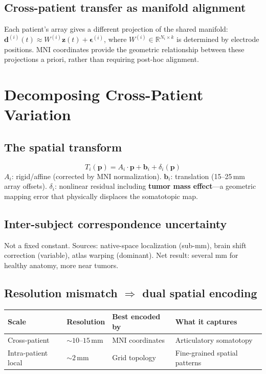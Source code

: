 \documentclass[11pt,letterpaper]{article}
\newcommand{\bfp}{\mathbf{p}}
\newcommand{\bfz}{\mathbf{z}}
\newcommand{\bfd}{\mathbf{d}}
\newcommand{\bfb}{\mathbf{b}}
\newcommand{\R}{\mathbb{R}}
\begin{document}
\subsection{Cross-patient transfer as manifold alignment}

Each patient's array gives a different projection of the shared manifold:
$\bfd^{(i)}(t) \approx W^{(i)} \bfz(t) + \boldsymbol{\epsilon}^{(i)}$,
where $W^{(i)} \in \R^{N_i \times k}$ is determined by electrode positions. MNI coordinates provide the geometric relationship between these projections a priori, rather than requiring post-hoc alignment.


\section{Decomposing Cross-Patient Variation}

\subsection{The spatial transform}

\begin{equation}
T_i(\bfp) = A_i \cdot \bfp + \bfb_i + \delta_i(\bfp)
\end{equation}
$A_i$: rigid/affine (corrected by MNI normalization). $\bfb_i$: translation (15--25\,mm array offsets). $\delta_i$: nonlinear residual including \textbf{tumor mass effect}---a geometric mapping error that physically displaces the somatotopic map.

\subsection{Inter-subject correspondence uncertainty}

Not a fixed constant. Sources: native-space localization (sub-mm), brain shift correction (variable), atlas warping (dominant). Net result: several mm for healthy anatomy, more near tumors.

\subsection{Resolution mismatch $\Rightarrow$ dual spatial encoding}

\begin{table}[ht]\centering\small
\begin{tabular}{@{}llll@{}}
\toprule
\textbf{Scale} & \textbf{Resolution} & \textbf{Best encoded by} & \textbf{What it captures}\\
\midrule
Cross-patient & ${\sim}10$--$15$\,mm & MNI coordinates & Articulatory somatotopy\\
Intra-patient local & ${\sim}2$\,mm & Grid topology & Fine-grained spatial patterns\\
\bottomrule
\end{tabular}
\end{table}
\end{document}
